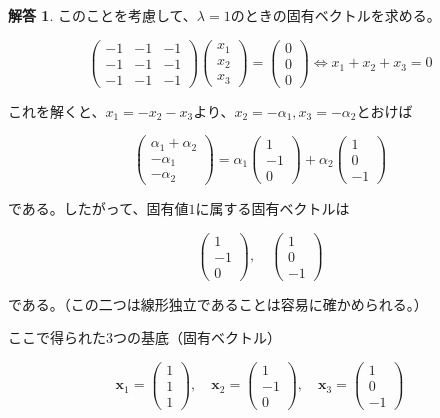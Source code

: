 \documentclass[dvipdfmx,autodetect-engine]{jsarticle}
\theoremstyle{definition}
\newtheorem*{Answer*}{解答}
\begin{document}
{\begin{Answer*}
このことを考慮して、$\lambda = 1$のときの固有ベクトルを求める。

$$
\begin{pmatrix}
-1 & -1 & -1 \\
-1 & -1 & -1 \\
-1 & -1 & -1
\end{pmatrix}\begin{pmatrix}
x_1 \\
x_2 \\
x_3
\end{pmatrix} = \begin{pmatrix}
0 \\
0 \\
0
\end{pmatrix} \Longleftrightarrow x_1 + x_2 + x_3 = 0
$$ 

これを解くと、$x_1 = - x_2 - x_3$より、$x_2 = -\alpha_1, x_3 = -\alpha_2$とおけば

$$
\begin{pmatrix}
\alpha_1 + \alpha_2 \\
-\alpha_1 \\
-\alpha_2
\end{pmatrix} = \alpha_1 \begin{pmatrix}
1 \\
-1 \\
0
\end{pmatrix} + \alpha_2 \begin{pmatrix}
1 \\
0 \\
-1
\end{pmatrix}
$$

である。したがって、固有値$1$に属する固有ベクトルは

$$
\begin{pmatrix}
1 \\
-1 \\
0
\end{pmatrix}, \quad \begin{pmatrix}
1 \\
0 \\
-1
\end{pmatrix}
$$

である。（この二つは線形独立であることは容易に確かめられる。）

ここで得られた3つの基底（固有ベクトル）

$$
\bm{x}_1 = \begin{pmatrix}
1 \\
1 \\
1
\end{pmatrix}, \quad \bm{x}_2 = \begin{pmatrix}
1 \\
-1 \\
0
\end{pmatrix}, \quad \bm{x}_3 = \begin{pmatrix}
1 \\
0 \\
-1
\end{pmatrix}
$$


\end{Answer*}}
\end{document}
